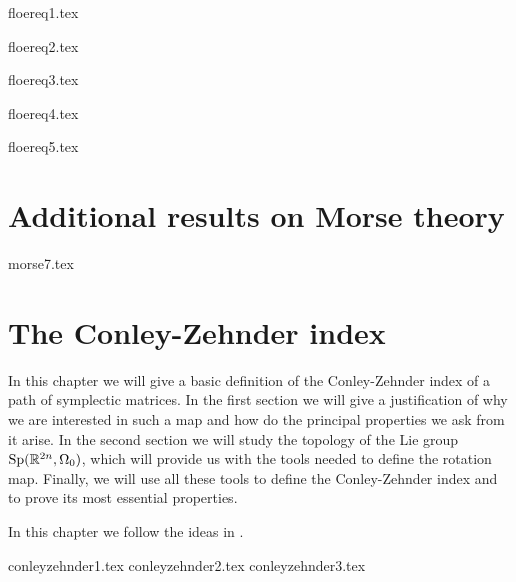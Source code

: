 \documentclass[a4paper,11pt]{book}
\begin{document}
 {floereq1.tex}

 {floereq2.tex}

 {floereq3.tex}

 {floereq4.tex}

 {floereq5.tex}


\begin{appendices}
\chapter{Additional results on Morse theory}
{morse7.tex}

\chapter{The Conley-Zehnder index}

In this chapter we will give a basic definition of the Conley-Zehnder index of a path of symplectic matrices. In the first section we will give a justification of why we are interested in such a map and how do the principal properties we ask from it arise. In the second section we will study the topology of the Lie group $\mathrm{Sp}(\mathbb{R}^{2n},\Omega_0)$, which will provide us with the tools needed to define the rotation map. Finally, we will use all these tools to define the Conley-Zehnder index and to prove its most essential properties.

In this chapter we follow the ideas in \cite{gutt2012conley}.

{conleyzehnder1.tex}
{conleyzehnder2.tex}
{conleyzehnder3.tex}
\end{appendices}



\end{document}
